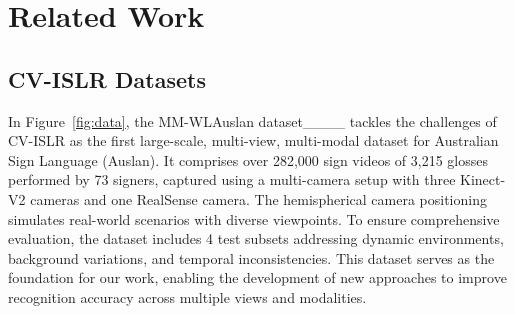 \section{Related Work}
\subsection{CV-ISLR Datasets} \label{sec:dataset}
In Figure~\ref{fig:data}, the MM-WLAuslan dataset____ tackles the challenges of CV-ISLR as the first large-scale, multi-view, multi-modal dataset for Australian Sign Language (Auslan). It comprises over 282,000 sign videos of 3,215 glosses performed by 73 signers, captured using a multi-camera setup with three Kinect-V2 cameras and one RealSense camera. The hemispherical camera positioning simulates real-world scenarios with diverse viewpoints. To ensure comprehensive evaluation, the dataset includes 4 test subsets addressing dynamic environments, background variations, and temporal inconsistencies. This dataset serves as the foundation for our work, enabling the development of new approaches to improve recognition accuracy across multiple views and modalities.

